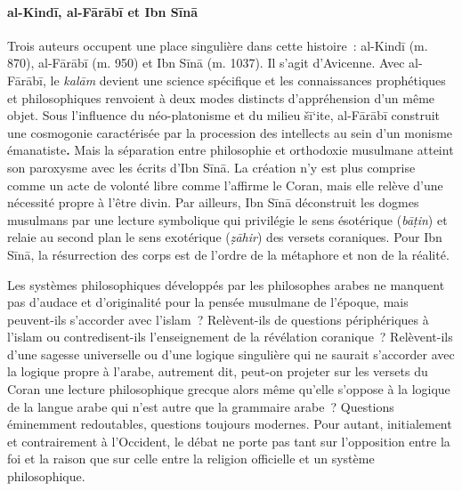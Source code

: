 \paragraph{al-Kindī, al-Fārābī et Ibn Sīnā}
Trois auteurs occupent une place singulière dans cette
histoire~: al-Kindī (m. 870), al-Fārābī (m. 950) et Ibn Sīnā (m. 1037).
Il s'agit d'Avicenne. Avec al-Fārābī, le \emph{kalām} devient une
science spécifique et les connaissances prophétiques et philosophiques
renvoient à deux modes distincts d'appréhension d'un même objet. Sous
l'influence du néo-platonisme et du milieu šī`ite, al-Fārābī construit
une cosmogonie caractérisée par la procession des intellects au sein
d'un monisme émanatiste\textbf{.} Mais la séparation entre philosophie
et orthodoxie musulmane atteint son paroxysme avec les écrits d'Ibn
Sīnā. La création n'y est plus comprise comme un acte de volonté libre
comme l'affirme le Coran, mais elle relève d'une nécessité propre à
l'être divin. Par ailleurs, Ibn Sīnā déconstruit les dogmes musulmans
par une lecture symbolique qui privilégie le sens ésotérique
(\emph{bāṭin}) et relaie au second plan le sens exotérique
(\emph{ẓāhir}) des versets coraniques. Pour Ibn Sīnā, la résurrection
des corps est de l'ordre de la métaphore et non de la
réalité.

Les systèmes philosophiques développés par les philosophes arabes ne
manquent pas d'audace et d'originalité pour la pensée musulmane de
l'époque, mais peuvent-ils s'accorder avec l'islam~? Relèvent-ils de
questions périphériques à l'islam ou contredisent-ils l'enseignement de
la révélation coranique~? Relèvent-ils d'une sagesse universelle ou
d'une logique singulière qui ne saurait s'accorder avec la logique
propre à l'arabe, autrement dit, peut-on projeter sur les versets du
Coran une lecture philosophique grecque alors même qu'elle s'oppose à la
logique de la langue arabe qui n'est autre que la grammaire
arabe~? Questions éminemment redoutables, questions toujours
modernes. Pour autant, initialement et contrairement à l'Occident, le
débat ne porte pas tant sur l'opposition entre la foi et la raison que
sur celle entre la religion officielle et un système philosophique.


